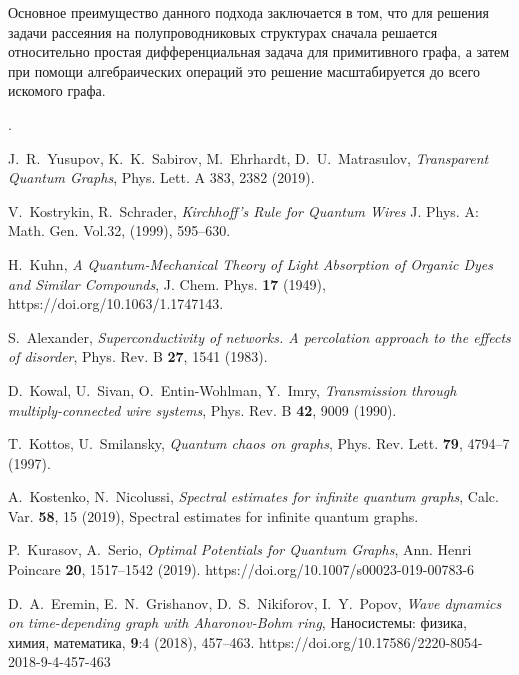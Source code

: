 \documentclass[a4 paper, 12 pt]{extarticle}
\begin{document}
   Основное преимущество данного подхода заключается в том, что для решения задачи рассеяния на полупроводниковых структурах сначала решается относительно простая дифференциальная задача для примитивного графа, а затем при помощи алгебраических операций это решение масштабируется до всего искомого графа.
   
   
\newpage.
\renewcommand{\refname}{ЛИТЕРАТУРА}
\begin{thebibliography}{1} %
	
	 J.~R.~Yusupov, K.~K.~Sabirov, M.~Ehrhardt, D.~U.~Matrasulov, {\it Transparent Quantum Graphs}, Phys. Lett. A 383, 2382 (2019).
	
	 V.~Kostrykin, R.~Schrader, {\it Kirchhoff's Rule for Quantum Wires} J. Phys. A: Math. Gen. Vol.32, (1999), 595--630.
	
	 H.~Kuhn, {\it A Quantum-Mechanical Theory of Light Absorption of Organic Dyes and Similar Compounds}, J. Chem. Phys. \textbf{17} (1949), https://doi.org/10.1063/1.1747143.
	
	 S.~Alexander, {\it Superconductivity of networks. A percolation approach to the effects of disorder}, Phys. Rev. B \textbf{27}, 1541 (1983).
	
	 D.~Kowal, U.~Sivan, O.~Entin-Wohlman, Y.~Imry, {\it Transmission through multiply-connected wire systems}, Phys. Rev. B \textbf{42}, 9009 (1990).

	 T.~Kottos, U.~Smilansky, {\it Quantum chaos on graphs}, Phys. Rev. Lett. \textbf{79}, 4794--7 (1997).
	
	 A.~Kostenko, N.~Nicolussi, {\it Spectral estimates for infinite quantum graphs}, Calc. Var. \textbf{58}, 15 (2019), Spectral estimates for infinite quantum graphs.
	
	  P.~Kurasov, A.~Serio, {\it Optimal Potentials for Quantum Graphs}, Ann. Henri Poincare \textbf{20}, 1517--1542 (2019). https://doi.org/10.1007/s00023-019-00783-6
	
	 D.~A.~Eremin, E.~N.~Grishanov, D.~S.~Nikiforov, I.~Y.~Popov, {\it Wave dynamics on time-depending graph with Aharonov-Bohm ring}, Наносистемы: физика, химия, математика, \textbf{9}:4 (2018), 457--463. https://doi.org/10.17586/2220-8054-2018-9-4-457-463
	

\end{thebibliography}
\end{document}
